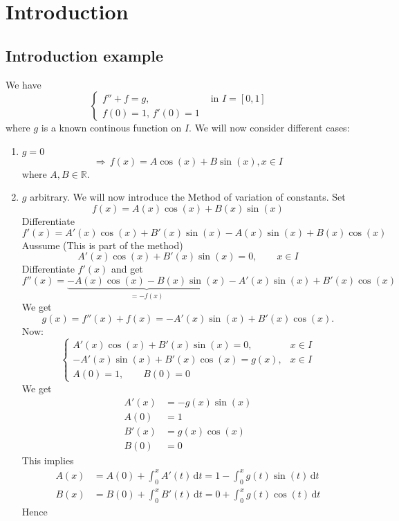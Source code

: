 
\section{Introduction}
\subsection{Introduction example} 
\label{sub:introduction_example}
We have
\[
	\begin{cases}
		f''+f =g, &\text{ in }I = [0,1]\\
		f(0)=1, \,f'(0)=1
	\end{cases}
\]
where $g$ is a known continous function on $I$. We will now consider different cases:

\begin{enumerate}[1.]
	\item $g=0$
	\[
		\Rightarrow \,f(x) = A \cos(x) + B \sin(x), x \in I
	\]
	where $A,B \in \mathbb{R}$.
	\item $g$ arbitrary. We will now introduce the Method of variation of constants. Set
	\[
		f(x)=A(x) \cos(x)+ B(x) \sin(x)
	\]
	Differentiate
	\[
		f'(x) = A'(x) \cos(x) + B'(x) \sin(x) - A(x) \sin(x) + B(x) \cos(x)
	\]
	Aussume (This is part of the method)
	\[
		A'(x)\cos(x) + B'(x) \sin(x) = 0, \qquad x \in I
	\]
	Differentiate $f'(x)$ and get
	\[
		f''(x)=\underset{= -f(x)}{\underbrace{-A(x) \cos(x) - B(x) \sin(x)}} - A'(x) \sin(x) + B'(x) \cos(x)
	\]
	We get
	\[
		g(x) = f''(x)+f(x) = -A'(x) \sin(x) + B'(x) \cos(x).
	\]
	Now:
	\[
		\begin{cases}
			A'(x)\cos(x) + B'(x) \sin(x) = 0, & x \in I\\
			- A'(x) \sin(x)+ B'(x) \cos(x) = g(x), & x \in I \\
			A(0)=1, \qquad B(0)=0 &
		\end{cases}
	\]
	We get
	\begin{align*}
		A'(x) &= - g(x)\sin(x) \\
		A(0) &= 1 \\
		B'(x) &= g(x) \cos(x) \\
		B(0) &=0
	\end{align*}
	This implies
	\begin{align*}
		A(x) &= A(0) + \int_{0}^{x} A'(t) \,\mathrm{d}t = 1 - \int_{0}^{x} g(t) \sin(t) \,\mathrm{d}t \\
		B(x) &= B(0) + \int_{0}^{x}B'(t) \,\mathrm{d}t = 0 + \int_{0}^{x}g(t)\cos(t) \,\mathrm{d}t
	\end{align*}
	Hence

\end{enumerate}
